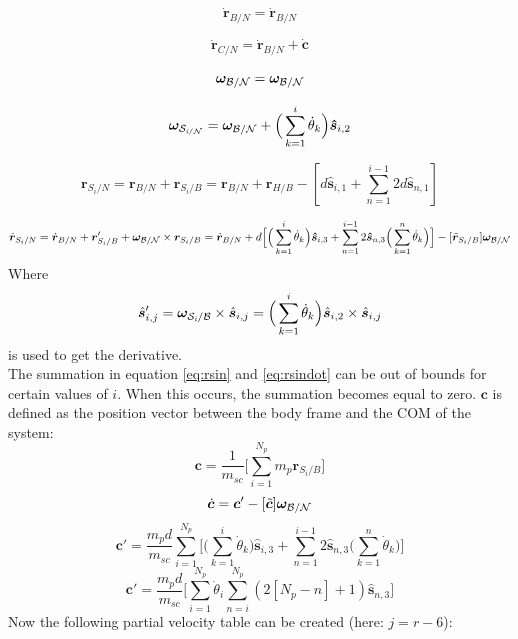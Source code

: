 \begin{equation}
	\dot{\bm r}_{B/N} = \dot{\bm r}_{B/N}
\end{equation}

\begin{equation}
	\dot{\bm r}_{C/N} = \dot{\bm r}_{B/N} + \dot{\bm c}
	\label{eq:rDot_CN}
\end{equation}

\begin{equation}
	\bm \omega_{\cal{B/N}} = \bm \omega_{\cal{B/N}}
\end{equation}

\begin{equation}
	\bm \omega_{\cal S_{\textit{i}/N}} = \bm \omega_{\cal{B/N}} + \Big(\sum_{k=1}^{i} \dot{\theta}_k \Big) \bm{\hat{s}}_{i,2}
\end{equation}

\begin{equation}
	\label{eq:rsin}
	\bm r_{S_{i}/N} = \bm r_{B/N} + \bm r_{S_{i}/B} = \bm r_{B/N} + \bm r_{H/B} - [d\bm{\hat{s}}_{i,1} + \sum_{n=1}^{i-1} 2d\bm{\hat{s}}_{n,1} ]
\end{equation}

\begin{equation}
	\label{eq:rsindot}
	\dot{\bm r}_{S_{i}/N} = \dot{\bm r}_{B/N} + {\bm r}'_{S_{i}/B} + \bm \omega_{\cal{B/N}} \times {\bm r}_{S_{i}/B} = \dot{\bm r}_{B/N} + d\Big[\Big(\sum_{k=1}^{i} \dot{\theta}_k \Big) \bm{\hat{s}}_{i,3} + \sum_{n=1}^{i-1} 2\bm{\hat{s}}_{n,3}\Big(\sum_{k=1}^{n} \dot{\theta}_k \Big) \Big]  - [\tilde{{\bm r}}_{S_{i}/B}] \bm \omega_{\cal{B/N}}
\end{equation}
Where
\begin{equation}
	\label{eq:sijp}
	\hat{\bm s}'_{i,j} = \bm\omega_{\cal{S}_{\textit{i}}/\cal{B}}\times\hat{\bm s}_{i,j}=\Big(\sum_{k=1}^{i} \dot{\theta}_k \Big)\hat{\bm s}_{i,2}\times\hat{\bm s}_{i,j}
\end{equation}
is used to get the derivative.\\
The summation in equation \ref{eq:rsin} and \ref{eq:rsindot} can be out of bounds for certain values of $i$. When this occurs, the summation becomes equal to zero. $\bm c$ is defined as the position vector between the body frame and the COM of the system:
\begin{equation}
	\bm c = \frac{1}{m_{sc}}\Big[ \sum_{i=1}^{N_p} m_p {\bm r}_{S_i/B}\Big]
\end{equation}
\begin{equation}
	\dot{\bm c} = {\bm c}' - [\tilde{\bm c}]{\bm \omega}_{\cal{B/N}} 
\end{equation}
\begin{equation}
	{\bm c}' = \frac{m_p d}{m_{sc}} \sum_{i=1}^{N_p} \Big[\Big(\sum_{k=1}^{i} \dot{\theta}_k \Big) \bm{\hat{s}}_{i,3} + \sum_{n=1}^{i-1} 2\bm{\hat{s}}_{n,3}\Big(\sum_{k=1}^{n} \dot{\theta}_k \Big) \Big] 
	\label{eq:cprime1}
\end{equation}
\begin{equation}
	{\bm c}' = \frac{m_p d}{m_{sc}} \Big[\sum_{i=1}^{N_p} \dot{\theta}_i  \sum_{n=i}^{N_p} (2[N_p - n]+1 )\bm{\hat{s}}_{n,3}\Big] 
	\label{eq:cprime2}
\end{equation}
Now the following partial velocity table can be created (here: $j = r-6$):

